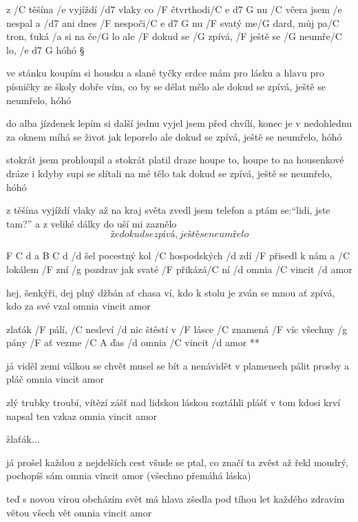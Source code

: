 
z /C těšína /e vyjíždí /d7 vlaky co /F čtvrthodi/{C e d7 G} nu
/C včera jsem /e nespal a /d7 ani dnes /F nespoči/{C e d7 G} nu
/F svatý me/G dard, můj pa/C tron, ťuká /a si na če/G lo
ale /F dokud se /G zpívá, /F ještě se /G neumře/C lo, /{e d7 G} hóhó \S

ve stánku koupím si housku a slané tyčky
srdce mám pro lásku a hlavu pro písničky
ze školy dobře vím, co by se dělat mělo
ale dokud se zpívá, ještě se neumřelo, hóhó \s

do alba jízdenek lepím si další jednu
vyjel jsem před chvílí, konec je v nedohlednu
za oknem míhá se život jak leporelo
ale dokud se zpívá, ještě se neumřelo, hóhó \s

stokrát jsem prohloupil a stokrát platil draze
houpe to, houpe to na housenkové dráze
i kdyby supi se slítali na mé tělo
tak dokud se zpívá, ještě se neumřelo, hóhó \s

z těšína vyjíždí vlaky až na kraj světa
zvedl jsem telefon a ptám se:``lidi, jste tam?''
a z veliké dálky do uší mi zaznělo
\[ že dokud se zpívá, ještě se neumřelo \]




F C d a B C d
/d šel pocestný kol /C hospodských /d zdí
/F přisedl k nám a /C lokálem /F zní
/g pozdrav jak svaté /F přikázá/C ní
/d omnia /C vincit /d amor \s

hej, šenkýři, dej plný džbán
ať chasa ví, kdo k stolu je zván
se mnou ať zpívá, kdo za své vzal
omnia vincit amor \s

\R zlaťák /F pálí, /C nesleví /d nic
   štěstí v /F lásce /C znamená /F víc
   všechny /g pány /F ať vezme /{C A} ďas
   /d omnia /C vincit /d amor **

já viděl zemi válkou se chvět
musel se bít a nenávidět
v plamenech pálit prosby a pláč
omnia vincit amor \s

zlý trubky troubí, vítězí zášť
nad lidskou láskou roztáhli plášť
v tom kdosi krví napsal ten vzkaz
omnia vincit amor \s

\r zlaťák...

já prošel každou z nejdelších cest
všude se ptal, co značí ta zvěst
až řekl moudrý, pochopíš sám
omnia vincit amor (všechno přemáhá láska) \s

\rr

teď s novou vírou obcházím svět
má hlava zšedla pod tíhou let
každého zdravím větou všech vět
omnia vincit amor



